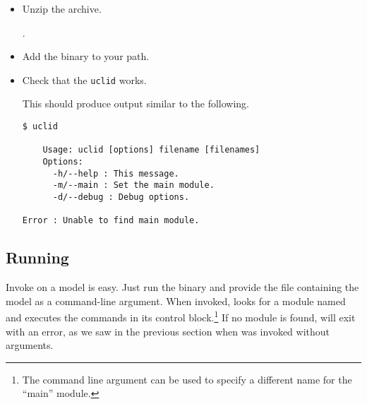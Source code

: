 \begin{itemize}
  \item Unzip the archive.

  .

\begin{comment}
  This should produce output similar to the following.
\begin{Verbatim}[frame=single]
Archive:  uclid-0.8.zip
  inflating: uclid-0.8/lib/default.uclid-0.8.jar  
  inflating: uclid-0.8/lib/com.microsoft.z3.jar  
  inflating: uclid-0.8/lib/org.scala-lang.scala-library-2.12.0.jar  
  inflating: uclid-0.8/lib/org.scala-lang.modules.scala-parser-combinators_2.12-1.0.6.jar  
  inflating: uclid-0.8/lib/org.scalactic.scalactic_2.12-3.0.1.jar  
  inflating: uclid-0.8/lib/org.scala-lang.scala-reflect-2.12.0.jar  
  inflating: uclid-0.8/bin/uclid     
  inflating: uclid-0.8/bin/uclid.bat  
\end{Verbatim}
\end{comment}


  \item Add the  binary to your path.


  \item Check that the \texttt{uclid} works.


  This should produce output similar to the following.
\begin{Verbatim}[frame=single, samepage=true]
$ uclid

    Usage: uclid [options] filename [filenames]
    Options:
      -h/--help : This message.
      -m/--main : Set the main module.
      -d/--debug : Debug options.
  
Error : Unable to find main module.
\end{Verbatim}
\end{itemize}

\subsection{Running \uclid{}}

Invoke \uclid{} on a model is easy. Just run the  binary and provide the file containing the model as a command-line argument. When invoked, \uclid{} looks for a module named  and executes the commands in its control block.\footnote{The  command line argument can be used to specify a different name for the ``main'' module.} If no  module is found, \uclid{} will exit with an error, as we saw in the previous section when  was invoked without arguments.

